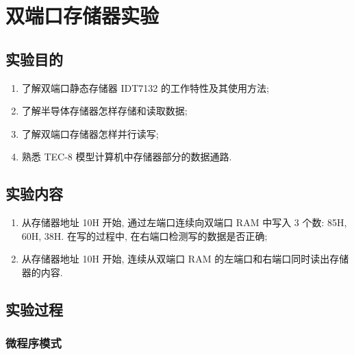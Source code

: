 \documentclass[../main.tex]{subfiles}
\begin{document}
\setcounter{chapter}{1}
\chapter{双端口存储器实验}

\section{实验目的}

\begin{enumerate}

    \item 了解双端口静态存储器 IDT7132 的工作特性及其使用方法;

    \item 了解半导体存储器怎样存储和读取数据;

    \item 了解双端口存储器怎样并行读写;

    \item 熟悉 TEC-8 模型计算机中存储器部分的数据通路.

\end{enumerate}

\section{实验内容}


\begin{enumerate}

    \item 从存储器地址 10H 开始, 通过左端口连续向双端口 RAM 中写入 3 个数: 85H, 60H, 38H. 在写的过程中, 在右端口检测写的数据是否正确;

    \item 从存储器地址 10H 开始, 连续从双端口 RAM 的左端口和右端口同时读出存储器的内容.

\end{enumerate}

\section{实验过程}

\subsection{微程序模式}
\end{document}
